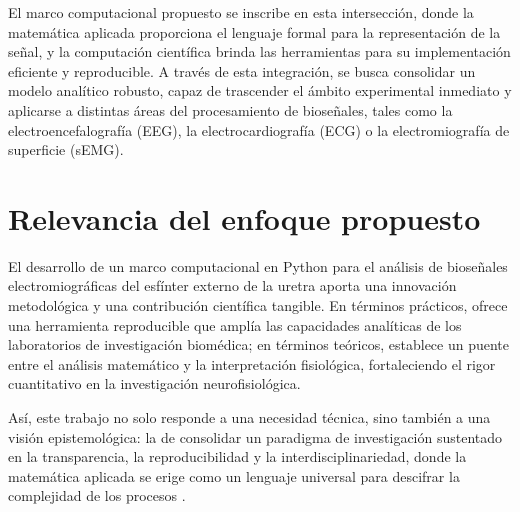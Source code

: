 El marco computacional propuesto se inscribe en esta intersección, donde la matemática aplicada proporciona el lenguaje formal para la representación de la señal, y la computación científica brinda las herramientas para su implementación eficiente y reproducible. A través de esta integración, se busca consolidar un modelo analítico robusto, capaz de trascender el ámbito experimental inmediato y aplicarse a distintas áreas del procesamiento de bioseñales, tales como la electroencefalografía (EEG), la electrocardiografía (ECG) o la electromiografía de superficie (sEMG).


\section{Relevancia del enfoque propuesto}
El desarrollo de un marco computacional en Python para el análisis de bioseñales electromiográficas del esfínter externo de la uretra aporta una innovación metodológica y una contribución científica tangible. En términos prácticos, ofrece una herramienta reproducible que amplía las capacidades analíticas de los laboratorios de investigación biomédica; en términos teóricos, establece un puente entre el análisis matemático y la interpretación fisiológica, fortaleciendo el rigor cuantitativo en la investigación neurofisiológica.

Así, este trabajo no solo responde a una necesidad técnica, sino también a una visión epistemológica: la de consolidar un paradigma de investigación sustentado en la transparencia, la reproducibilidad y la interdisciplinariedad, donde la matemática aplicada se erige como un lenguaje universal para descifrar la complejidad de los procesos  \cite{reaz2006emg} \cite{reaz2006emg}.


%
%
%


